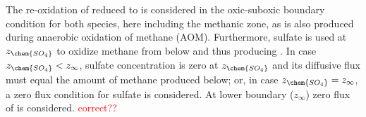 \documentclass[gmd, manuscript]{copernicus}
\begin{document}
The re-oxidation of reduced  to  is considered in the 
oxic-suboxic boundary condition for both species, here including the methanic zone, as  is also produced during anaerobic oxidation of methane (AOM). 
Furthermore, sulfate is used at $z_{\chem{SO_4}}$ to oxidize methane from below and thus producing . 
In case $z_{\chem{SO_4}}<z_\infty$, sulfate concentration is zero at $z_{\chem{SO_4}}$ and its diffusive flux must equal the amount of methane produced below; or, in case $z_{\chem{SO_4}}=z_\infty$, 
a zero flux condition for sulfate is considered. At lower boundary ($z_\infty$) zero flux of  is considered. 
\textcolor{red}{correct??}\\
\end{document}
